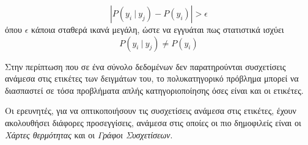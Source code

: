 \begin{equation} 
\left| P(y_{i} \: | \: y_{j}) - P(y_{i})\right| > \epsilon 
\end{equation}   
όπου $\epsilon$ κάποια σταθερά ικανά μεγάλη, ώστε να εγγυάται πως στατιστικά ισχύει 
\begin{equation} 
P(y_{i} \: | \: y_{j}) \neq P(y_i) 
\end{equation} 

Στην περίπτωση που σε ένα σύνολο δεδομένων δεν παρατηρούνται συσχετίσεις ανάμεσα στις ετικέτες των δειγμάτων του, το πολυκατηγορικό πρόβλημα μπορεί να διασπαστεί σε τόσα προβλήματα απλής κατηγοριοποίησης όσες είναι και οι ετικέτες. 

Οι ερευνητές, για να οπτικοποιήσουν τις συσχετίσεις ανάμεσα στις ετικέτες, έχουν ακολουθήσει διάφορες προσεγγίσεις, ανάμεσα στις οποίες οι πιο δημοφιλείς είναι οι \emph{Χάρτες θερμότητας} και οι \emph{Γράφοι Συσχετίσεων}.

